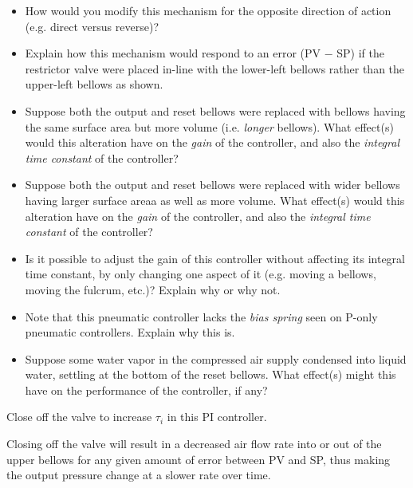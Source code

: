 \begin{itemize}
\item{} How would you modify this mechanism for the opposite direction of action (e.g. direct versus reverse)?
\item{} Explain how this mechanism would respond to an error (PV $-$ SP) if the restrictor valve were placed in-line with the lower-left bellows rather than the upper-left bellows as shown.
\item{} Suppose both the output and reset bellows were replaced with bellows having the same surface area but more volume (i.e. {\it longer} bellows).  What effect(s) would this alteration have on the {\it gain} of the controller, and also the {\it integral time constant} of the controller?
\item{} Suppose both the output and reset bellows were replaced with wider bellows having larger surface areaa as well as more volume.  What effect(s) would this alteration have on the {\it gain} of the controller, and also the {\it integral time constant} of the controller?
\item{} Is it possible to adjust the gain of this controller without affecting its integral time constant, by only changing one aspect of it (e.g. moving a bellows, moving the fulcrum, etc.)?  Explain why or why not.
\item{} Note that this pneumatic controller lacks the {\it bias spring} seen on P-only pneumatic controllers.  Explain why this is.
\item{} Suppose some water vapor in the compressed air supply condensed into liquid water, settling at the bottom of the reset bellows.  What effect(s) might this have on the performance of the controller, if any?  
\end{itemize}







Close off the valve to increase $\tau_i$ in this PI controller.







Closing off the valve will result in a decreased air flow rate into or out of the upper bellows for any given amount of error between PV and SP, thus making the output pressure change at a slower rate over time.

